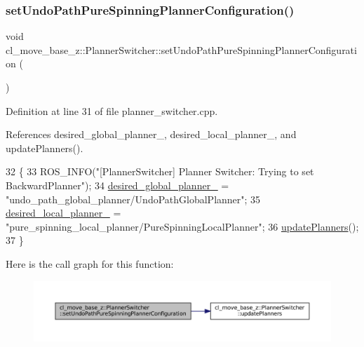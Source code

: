 \subsubsection{\texorpdfstring{set\+Undo\+Path\+Pure\+Spinning\+Planner\+Configuration()}{setUndoPathPureSpinningPlannerConfiguration()}}
{\footnotesize\ttfamily void cl\+\_\+move\+\_\+base\+\_\+z\+::\+Planner\+Switcher\+::set\+Undo\+Path\+Pure\+Spinning\+Planner\+Configuration (\begin{DoxyParamCaption}{ }\end{DoxyParamCaption})}



Definition at line 31 of file planner\+\_\+switcher.\+cpp.



References desired\+\_\+global\+\_\+planner\+\_\+, desired\+\_\+local\+\_\+planner\+\_\+, and update\+Planners().


\begin{DoxyCode}
32 \{
33   ROS\_INFO(\textcolor{stringliteral}{"[PlannerSwitcher] Planner Switcher: Trying to set BackwardPlanner"});
34   \hyperlink{classcl__move__base__z_1_1PlannerSwitcher_aef047d3778b2993c1df146bbad43e03d}{desired\_global\_planner\_} = \textcolor{stringliteral}{"undo\_path\_global\_planner/UndoPathGlobalPlanner"};
35   \hyperlink{classcl__move__base__z_1_1PlannerSwitcher_a6cbf65f11bb69125f913caaabdf7b4cf}{desired\_local\_planner\_} = \textcolor{stringliteral}{"pure\_spinning\_local\_planner/PureSpinningLocalPlanner"};
36   \hyperlink{classcl__move__base__z_1_1PlannerSwitcher_a146641f63aea3185daab4c5cbb789550}{updatePlanners}();
37 \}
\end{DoxyCode}
Here is the call graph for this function\+:
\nopagebreak
\begin{figure}[H]
\begin{center}
\leavevmode
\includegraphics[width=350pt]{classcl__move__base__z_1_1PlannerSwitcher_a560f77f78b527ed9a0d4f598d98713a3_cgraph}
\end{center}
\end{figure}
\mbox{\label{classcl__move__base__z_1_1PlannerSwitcher_a146641f63aea3185daab4c5cbb789550}} 
